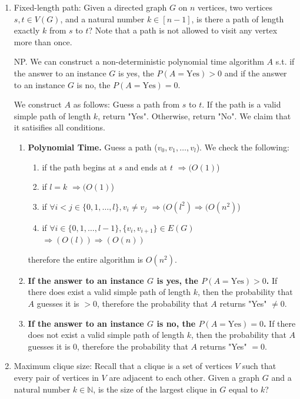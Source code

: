 \documentclass[12pt]{article}
\begin{document}
\begin{enumerate}
\item[(a)] Fixed-length path: Given a directed graph $G$ on $n$ vertices, two vertices $s,t \in V(G)$, and a natural number $k \in [n-1]$, is there a path of length exactly $k$ from $s$ to $t$? Note that a path is not allowed to visit any vertex more than once.

NP. We can construct a non-deterministic polynomial time algorithm $A$ s.t. if the answer to an instance $G$ is yes, the $P(A = \text{Yes}) > 0$ and if the answer to an instance $G$ is no, the $P(A = \text{Yes}) = 0$.

We construct $A$ as follows: Guess a path from $s$ to $t$. If the path is a valid simple path of length $k$, return "Yes". Otherwise, return "No". We claim that it satisifies all conditions.

\begin{enumerate}
  \item[] \textbf{Polynomial Time.} Guess a path ($v_0, v_1, \dots, v_l$). We check the following:
  \begin{enumerate}
    \item if the path begins at $s$ and ends at $t$ $\Rightarrow (O(1)$)
    \item if $l = k$ $\Rightarrow (O(1)$)
    \item if $\forall i < j \in \{0, 1, \dots, l\}, v_i \ne v_j$ $\Rightarrow (O(l^2) \Rightarrow (O(n^2)$) 
    \item if $\forall i \in \{0, 1, \dots, l-1\}, \{v_i, v_{i+1}\} \in E(G)$ $\Rightarrow (O(l)) \Rightarrow (O(n))$
  \end{enumerate}
  therefore the entire algorithm is $O(n^2)$.
  \item[] \textbf{If the answer to an instance $G$ is yes, the $P(A = \text{Yes}) > 0$.} If there does exist a valid simple path of length $k$, then the probability that $A$ guesses it is $> 0$, therefore the probability that $A$ returns "Yes" $\ne 0$.
  \item[] \textbf{If the answer to an instance $G$ is no, the $P(A = \text{Yes}) = 0$.} If there does not exist a valid simple path of length $k$, then the probability that $A$ guesses it is $0$, therefore the probability that $A$ returns "Yes" $= 0$.
\end{enumerate}


\item[(b)] Maximum clique size: Recall that a clique is a set of vertices $V$ such that every pair of vertices in $V$ are adjacent to each other. Given a graph $G$ and a natural number $k \in \mathbb{N}$, is the size of the largest clique in $G$ equal to $k$?


\end{enumerate}
\end{document}

